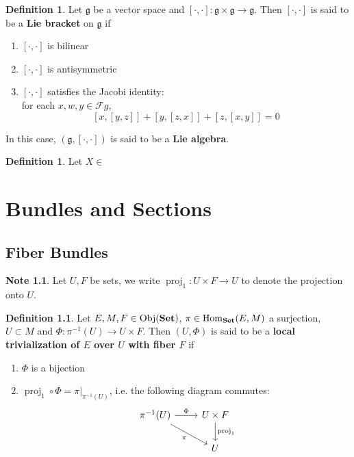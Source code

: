 \documentclass{book}
\theoremstyle{definition}
\newtheorem{defn}[definition]{Definition}
\newtheorem{note}[definition]{Note}
\newcommand{\MF}{\mathcal{F}}
\newcommand{\MFg}{\mathfrak{g}}
\DeclareMathOperator{\Obj}{Obj}
\DeclareMathOperator{\Hom}{Hom}
\DeclareMathOperator{\prj}{\text{proj}}
\DeclareMathOperator*{\Set}{\text{\tbf{Set}}}
\DeclareMathOperator*{\0}{\mbf{0}}
\DeclareMathOperator*{\1}{\mbf{1}}
\newcommand{\tbf}[1]{\textbf{#1}}
\begin{document}
	\begin{defn}
		Let $\MFg$ be a vector space and $[\cdot, \cdot]: \MFg \times \MFg \rightarrow \MFg$. 
		Then $[\cdot, \cdot]$ is said to be a \tbf{Lie bracket} on $\MFg$ if  
		\begin{enumerate}
			\item $[\cdot, \cdot]$ is bilinear
			\item $[\cdot, \cdot]$ is antisymmetric
			\item $[\cdot, \cdot]$ satisfies the Jacobi identity: \\
			for each $x, w, y \in \MF g$, 
			$$[x, [y,z]] + [y, [z,x]] + [z, [x,y]] = 0$$
		\end{enumerate}
		In this case, $(\MFg, [\cdot, \cdot])$ is said to be a \tbf{Lie algebra}.
	\end{defn}

	\begin{defn}
		Let $X \in $
	\end{defn}
	
	
	
	
	
	
	
	
	
	
	
	
	
	
	
	
	
	
	
	
	
	
	
	
	
	
	\newpage
	\chapter{Bundles and Sections}
	
	\section{Fiber Bundles}
	
	\begin{note}
		Let $U, F$ be sets, we write $\prj_1: U \times F \rightarrow U$ to denote the projection onto $U$.
	\end{note}

	\begin{defn}
		Let $E, M, F \in \Obj(\Set)$, $\pi \in \Hom_{\Set}(E, M)$ a surjection, $U \subset M$ and $\Phi: \pi^{-1}(U) \rightarrow U \times F$. Then $(U, \Phi)$ is said to be a \tbf{local trivialization of $E$ over $U$ with fiber $F$}  if 
		\begin{enumerate}
			\item $\Phi$ is a bijection
			\item $\prj_1 \circ \Phi = \pi|_{\pi^{-1}(U)}$, i.e. the following diagram commutes:
			\[ 
			\begin{tikzcd}
				\pi^{-1}(U) \arrow[r, "\Phi"] \arrow[dr, "\pi"'] & U \times F \arrow[d, "\prj_1"]  \\
				& U
			\end{tikzcd}
			\]
		\end{enumerate}
	\end{defn}
	
\end{document}
